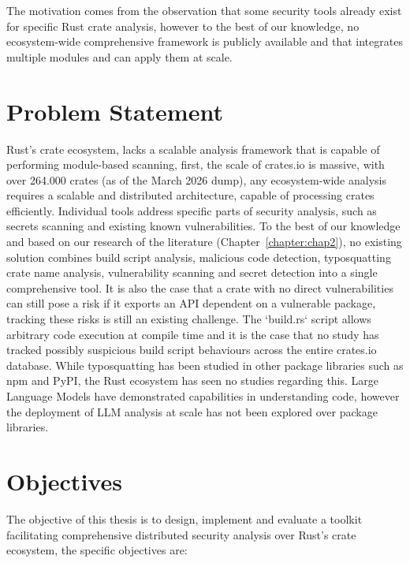 The motivation comes from the observation that some security tools already exist for specific Rust crate analysis, however to the best of our knowledge, no ecosystem-wide comprehensive framework is publicly available and that integrates multiple modules and can apply them at scale. 

\section{Problem Statement}\label{sect:problem-statement}

Rust's crate ecosystem, lacks a scalable analysis framework that is capable of performing module-based scanning, first, the scale of crates.io is massive, with over 264.000 crates (as of the March 2026 dump), any ecosystem-wide analysis requires a scalable and distributed architecture, capable of processing crates efficiently. Individual tools address specific parts of security analysis, such as secrets scanning and existing known vulnerabilities. To the best of our knowledge and based on our research of the literature (Chapter~\ref{chapter:chap2}), no existing solution combines build script analysis, malicious code detection, typosquatting crate name analysis, vulnerability scanning and secret detection into a single comprehensive tool. It is also the case that a crate with no direct vulnerabilities can still pose a risk if it exports an API dependent on a vulnerable package, tracking these risks is still an existing challenge. The `build.rs` script allows arbitrary code execution at compile time and it is the case that no study has tracked possibly suspicious build script behaviours across the entire crates.io database. While typosquatting has been studied in other package libraries such as npm and PyPI, the Rust ecosystem has seen no studies regarding this. Large Language Models have demonstrated capabilities in understanding code, however the deployment of LLM analysis at scale has not been explored over package libraries.


\section{Objectives}\label{sect:objectives}

The objective of this thesis is to design, implement and evaluate a toolkit facilitating comprehensive distributed security analysis over Rust's crate ecosystem, the specific objectives are:

